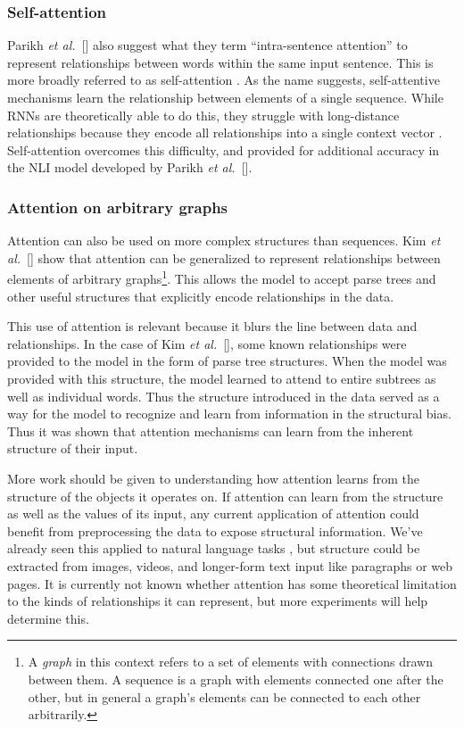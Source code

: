 \documentclass{article}
\newcommand{\etal}{\textit{et al.}}
\begin{document}
\subsubsection{Self-attention}

Parikh \etal~[\citeyear{natural_language_inference}] also suggest what they term ``intra-sentence attention'' to represent relationships between words within the same input sentence. This is more broadly referred to as self-attention \cite{self_attentive_embedding,attn_all_you_need}. As the name suggests, self-attentive mechanisms learn the relationship between elements of a single sequence. While RNNs are theoretically able to do this, they struggle with long-distance relationships because they encode all relationships into a single context vector \cite{joint_align_translate}. Self-attention overcomes this difficulty, and provided for additional accuracy in the NLI model developed by Parikh \etal~[\citeyear{natural_language_inference}].

\subsubsection{Attention on arbitrary graphs}

Attention can also be used on more complex structures than sequences. Kim \etal~[\citeyear{graphs}] show that attention can be generalized to represent relationships between elements of arbitrary graphs\footnote{A \textit{graph} in this context refers to a set of elements with connections drawn between them. A sequence is a graph with elements connected one after the other, but in general a graph's elements can be connected to each other arbitrarily.}. This allows the model to accept parse trees and other useful structures that explicitly encode relationships in the data.

This use of attention is relevant because it blurs the line between data and relationships. In the case of Kim \etal~[\citeyear{graphs}], some known relationships were provided to the model in the form of parse tree structures. When the model was provided with this structure, the model learned to attend to entire subtrees as well as individual words. Thus the structure introduced in the data served as a way for the model to recognize and learn from information in the structural bias. Thus it was shown that attention mechanisms can learn from the inherent structure of their input.

More work should be given to understanding how attention learns from the structure of the objects it operates on. If attention can learn from the structure as well as the values of its input, any current application of attention could benefit from preprocessing the data to expose structural information. We've already seen this applied to natural language tasks \cite{graphs}, but structure could be extracted from images, videos, and longer-form text input like paragraphs or web pages. It is currently not known whether attention has some theoretical limitation to the kinds of relationships it can represent, but more experiments will help determine this.
\end{document}
